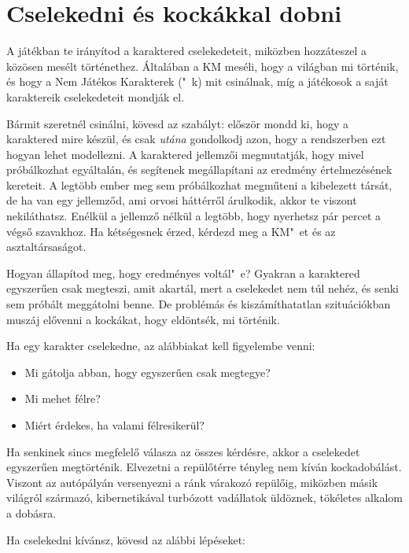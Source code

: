 \label{Cselekedni}
\chapter{Cselekedni és kockákkal dobni}

A  játékban te irányítod a karaktered cselekedeteit, miközben hozzáteszel a közösen mesélt történethez. Általában a KM meséli, hogy a világban mi történik, és hogy a Nem Játékos Karakterek ("~k) mit csinálnak, míg a játékosok a saját karaktereik cselekedeteit mondják el.

Bármit szeretnél csinálni, kövesd az  szabályt: először mondd ki, hogy a karaktered mire készül, és csak \emph{utána} gondolkodj azon, hogy a rendszerben ezt hogyan lehet modellezni. A karaktered jellemzői megmutatják, hogy mivel próbálkozhat egyáltalán, és segítenek megállapítani az eredmény értelmezésének kereteit. A legtöbb ember meg sem próbálkozhat megműteni a kibelezett társát, de ha van egy jellemződ, ami orvosi háttérről árulkodik, akkor te viszont nekiláthatsz. Enélkül a jellemző nélkül a legtöbb, hogy nyerhetsz pár percet a végső szavakhoz. Ha kétségesnek érzed, kérdezd meg a KM"~et és az asztaltársaságot.

Hogyan állapítod meg, hogy eredményes voltál"~e? Gyakran a karaktered egyszerűen csak megteszi, amit akartál, mert a cselekedet nem túl nehéz, és senki sem próbált meggátolni benne. De problémás és kiszámíthatatlan szituációkban muszáj elővenni a kockákat, hogy eldöntsék, mi történik.

Ha egy karakter cselekedne, az alábbiakat kell figyelembe venni:

\begin{itemize}
    \item Mi gátolja abban, hogy egyszerűen csak megtegye?
    \item Mi mehet félre?
    \item Miért érdekes, ha valami félresikerül?
\end{itemize}

Ha senkinek sincs megfelelő válasza az összes kérdésre, akkor a cselekedet egyszerűen megtörténik. Elvezetni a repülőtérre tényleg nem kíván kockadobálást. Viszont az autópályán versenyezni a ránk várakozó repülőig, miközben másik világról származó, kibernetikával turbózott vadállatok üldöznek, tökéletes alkalom a dobásra.

Ha cselekedni kívánsz, kövesd az alábbi lépéseket:

